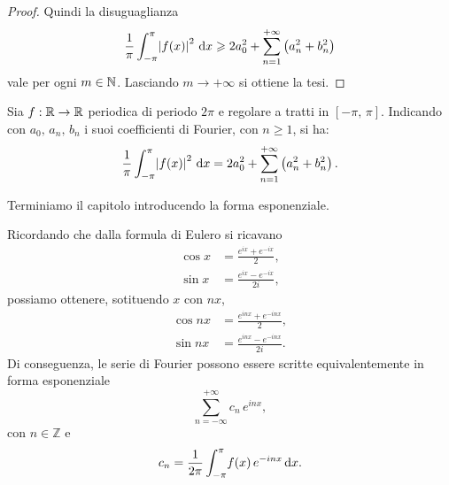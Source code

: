 \documentclass[../../analisi2]{subfiles}
\begin{document}
\begin{proof}
            Quindi la disuguaglianza
            \[
                \frac{1}{\pi} \int_{-\pi}^{\pi} \! \left|f(x)\right|^2 \, \mathrm{d}x \geqslant 2 a_0^2 + \sum_{n = 1}^{+\infty} \left(a_n^2 + b_n^2\right)
            \]
            vale per ogni \(m \in \mathbb{N}\). Lasciando \(m \to +\infty\) si ottiene la tesi.
        \end{proof}

        \begin{teorema}
            Sia \(f : \mathbb{R} \to \mathbb{R}\) periodica di periodo \(2\pi\) e regolare a tratti in \([-\pi, \, \pi]\). Indicando con
            \(a_0, \, a_n, \, b_n\) i suoi coefficienti di Fourier, con \(n \geqslant 1\), si ha:
            \[
                \frac{1}{\pi} \int_{-\pi}^{\pi} \! \left|f(x)\right|^2 \, \mathrm{d}x = 2 a_0^2 + \sum_{n = 1}^{+\infty} \left(a_n^2 + b_n^2\right).
            \]
        \end{teorema}

        \newpage

        Terminiamo il capitolo introducendo la forma esponenziale.

        \begin{definizione}
            Ricordando che dalla formula di Eulero si ricavano
            \begin{align*}
                \cos x &= \frac{e^{ix} + e^{-ix}}{2},\\
                \sin x &= \frac{e^{ix} - e^{-ix}}{2i},
            \end{align*}
            possiamo ottenere, sotituendo \(x\) con \(nx\),
            \begin{align*}
                \cos nx &= \frac{e^{inx} + e^{-inx}}{2},\\
                \sin nx &= \frac{e^{inx} - e^{-inx}}{2i}.
            \end{align*}
            Di conseguenza, le serie di Fourier possono essere scritte equivalentemente in forma esponenziale
            \[
                \sum_{n = -\infty}^{+\infty} c_n \, e^{inx},
            \]
            con \(n \in \mathbb{Z}\) e
            \[
                c_n = \frac{1}{2\pi} \int_{-\pi}^{\pi} \! f(x) \, e^{-inx} \, \mathrm{d}x.
            \]
        \end{definizione}
\end{document}
